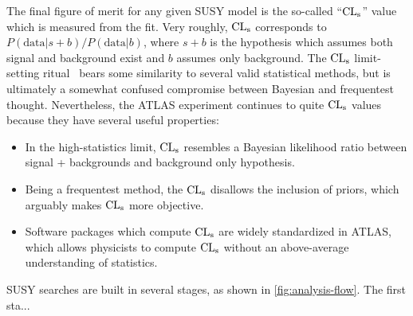 The final figure of merit for any given SUSY model is the so-called ``$\mathrm{CL}_{\mathrm{s}}$'' value which is measured from the fit. Very roughly, $\mathrm{CL}_{\mathrm{s}}$ corresponds to $P(\text{data}| s + b) / P(\text{data}| b)$, where $s + b$ is the hypothesis which assumes both signal and background exist and $b$ assumes only background. The $\mathrm{CL}_{\mathrm{s}}$ limit-setting ritual~\cite{cls} bears some similarity to several valid statistical methods, but is ultimately a somewhat confused compromise between Bayesian and frequentest thought. Nevertheless, the ATLAS experiment continues to quite $\mathrm{CL}_{\mathrm{s}}$ values because they have several useful properties:
\begin{itemize}
\item In the high-statistics limit, $\mathrm{CL}_{\mathrm{s}}$ resembles a Bayesian likelihood ratio between signal + backgrounds and background only hypothesis.
\item Being a frequentest method, the $\mathrm{CL}_{\mathrm{s}}$ disallows the inclusion of priors, which arguably makes $\mathrm{CL}_{\mathrm{s}}$ more objective.
\item Software packages which compute $\mathrm{CL}_{\mathrm{s}}$ are widely standardized in ATLAS, which allows physicists to compute $\mathrm{CL}_{\mathrm{s}}$ without an above-average understanding of statistics.
\end{itemize}

SUSY searches are built in several stages, as shown in \cref{fig:analysis-flow}. The first sta...
